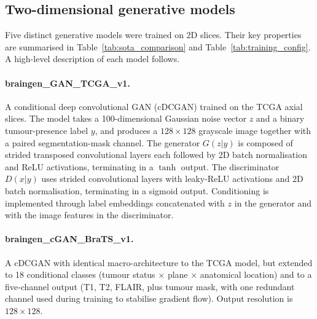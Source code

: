 \documentclass[11pt]{article}
\begin{document}
\subsection*{Two-dimensional generative models}

Five distinct generative models were trained on 2D slices. Their key properties are summarised in Table~\ref{tab:sota_comparison} and Table~\ref{tab:training_config}. A high-level description of each model follows.

\paragraph{braingen\_GAN\_TCGA\_v1.} A conditional deep convolutional GAN (cDCGAN)\cite{radford2015unsupervised,vishwakarma2020comparative} trained on the TCGA axial slices. The model takes a 100-dimensional Gaussian noise vector $z$ and a binary tumour-presence label $y$, and produces a $128\!\times\!128$ grayscale image together with a paired segmentation-mask channel. The generator $G(z|y)$ is composed of strided transposed convolutional layers each followed by 2D batch normalisation and ReLU activations, terminating in a $\tanh$ output. The discriminator $D(x|y)$ uses strided convolutional layers with leaky-ReLU activations and 2D batch normalisation, terminating in a sigmoid output. Conditioning is implemented through label embeddings concatenated with $z$ in the generator and with the image features in the discriminator.

\paragraph{braingen\_cGAN\_BraTS\_v1.} A cDCGAN with identical macro-architecture to the TCGA model, but extended to 18 conditional classes (tumour status $\times$ plane $\times$ anatomical location) and to a five-channel output (T1, T2, FLAIR, plus tumour mask, with one redundant channel used during training to stabilise gradient flow). Output resolution is $128\!\times\!128$.
\end{document}
